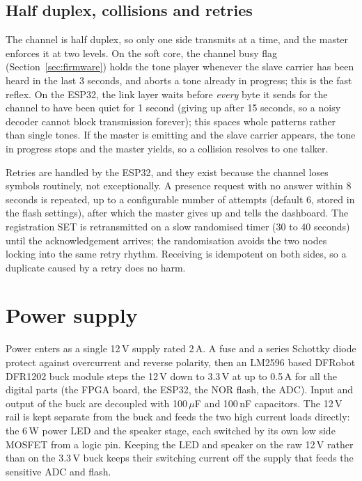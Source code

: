 \documentclass[a4paper,11pt]{article}
\begin{document}
\subsection{Half duplex, collisions and retries}

The channel is half duplex, so only one side transmits at a time, and the master
enforces it at two levels. On the soft core, the channel busy flag
(Section~\ref{sec:firmware}) holds the tone player whenever the slave carrier has
been heard in the last 3 seconds, and aborts a tone already in progress; this is
the fast reflex. On the ESP32, the link layer waits before \emph{every} byte it
sends for the channel to have been quiet for 1 second (giving up after 15
seconds, so a noisy decoder cannot block transmission forever); this spaces whole
patterns rather than single tones. If the master is emitting and the slave
carrier appears, the tone in progress stops and the master yields, so a collision
resolves to one talker.

Retries are handled by the ESP32, and they exist because the channel loses
symbols routinely, not exceptionally. A presence request with no answer within 8
seconds is repeated, up to a configurable number of attempts (default 6, stored
in the flash settings), after which the master gives up and tells the dashboard.
The registration SET is retransmitted on a slow randomised timer (30 to 40
seconds) until the acknowledgement arrives; the randomisation avoids the two
nodes locking into the same retry rhythm. Receiving is idempotent on both sides,
so a duplicate caused by a retry does no harm.

\section{Power supply}

Power enters as a single 12\,V supply rated 2\,A. A fuse and a series Schottky diode
protect against overcurrent and reverse polarity, then an LM2596 based DFRobot
DFR1202 buck module steps the 12\,V down to 3.3\,V at up to 0.5\,A for all the
digital parts (the FPGA board, the ESP32, the NOR flash, the ADC). Input and output
of the buck are decoupled with 100\,$\mu$F and 100\,nF capacitors. The 12\,V rail is
kept separate from the buck and feeds the two high current loads directly: the 6\,W
power LED and the speaker stage, each switched by its own low side MOSFET from a
logic pin. Keeping the LED and speaker on the raw 12\,V rather than on the 3.3\,V
buck keeps their switching current off the supply that feeds the sensitive ADC and
flash.
\end{document}
